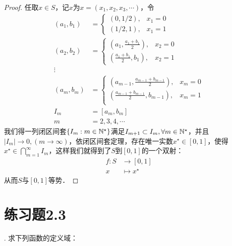 \begin{proof}
任取$x \in S$，记$x$为$x = (x_1,x_2,x_3,\cdots)$，令
\begin{align}
    (a_1, b_1) &= \begin{cases}
        (0, 1/2), & x_1 = 0 \\
        (1/2, 1), & x_1 = 1
    \end{cases} \\
    (a_2, b_2) &= \begin{cases}
        (a_1, \displaystyle\frac{a_1+b_1}{2}), & x_2 = 0 \\
        (\displaystyle\frac{a_1+b_1}{2}, b_1), & x_2 = 1
    \end{cases} \\
    \vdots \\
    (a_m, b_m) &= \begin{cases}
        (a_{m-1}, \displaystyle\frac{a_{m-1}+b_{m-1}}{2}), & x_m = 0 \\
        (\displaystyle\frac{a_{m-1}+b_{m-1}}{2}, b_{m-1}), & x_m = 1 \\
    \end{cases} \\
    I_m &= [a_m, b_m] \\
    m &= 2,3,4,\cdots 
\end{align}
我们得一列闭区间套$\{ I_m: m \in \mathbb{N}^\star \}$满足$I_{m+1} \subset I_m, \forall m \in \mathbb{N}^\star$，并且$|I_m| \to 0, (m \to \infty)$，依闭区间套定理，存在唯一实数$x^\star \in [0, 1]$，使得$x^\star \in \displaystyle\bigcap_{m=1}^\infty I_m$，这样我们就得到了$S$到$[0,1]$的一个双射：
\begin{align}
    f: S &\longrightarrow [0,1] \\
    x &\longmapsto x^\star
\end{align}
从而$S$与$[0,1]$等势．
\end{proof}

\section*{练习题2.3}
. 求下列函数的定义域：

